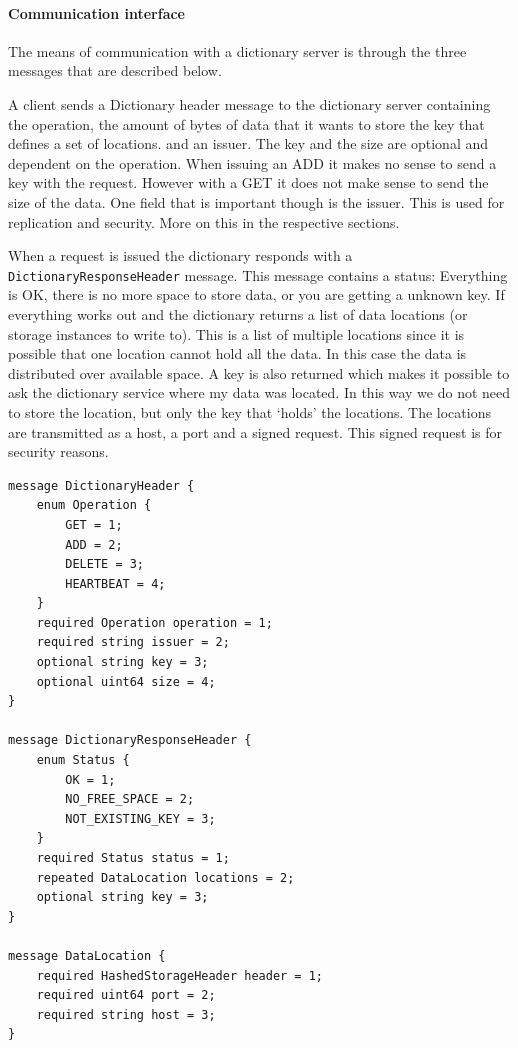 \documentclass[12pt,a4paper]{scrartcl}
\begin{document}
\paragraph{Communication interface}
The means of communication with a dictionary server is through the three messages that are described below. 

A client sends a Dictionary header message to the dictionary server containing the operation, the amount of bytes of data that it wants to store the key that defines a set of locations. and an issuer. The key and the size are optional and dependent on the operation. When issuing an ADD it makes no sense to send a key with the request. However with a GET it does not make sense to send the size of the data. One field that is important though is the issuer. This is used for replication and security. More on this in the respective sections.

When a request is issued the dictionary responds with a \texttt{DictionaryResponseHeader} message. This message contains a status:  Everything is OK, there is no more space to store data, or you are getting a unknown key. If everything works out and the dictionary returns a list of data locations (or storage instances to write to). This is a list of multiple locations since it is possible that one location cannot hold all the data. In this case the data is distributed over available space. A key is also returned which makes it possible to ask the dictionary service where my data was located. In this way we do not need to store the location, but only the key that `holds' the locations. The locations are transmitted as a host, a port and a signed request. This signed request is for security reasons.

\begin{verbatim}
message DictionaryHeader {
    enum Operation {
        GET = 1;
        ADD = 2;
        DELETE = 3;
        HEARTBEAT = 4;
    }
    required Operation operation = 1;
    required string issuer = 2;
    optional string key = 3;
    optional uint64 size = 4;
}

message DictionaryResponseHeader {
    enum Status {
        OK = 1;
        NO_FREE_SPACE = 2;
        NOT_EXISTING_KEY = 3;
    }
    required Status status = 1;
    repeated DataLocation locations = 2;
    optional string key = 3;
}

message DataLocation {
    required HashedStorageHeader header = 1;
    required uint64 port = 2;
    required string host = 3;
}
\end{verbatim}
\end{document}
